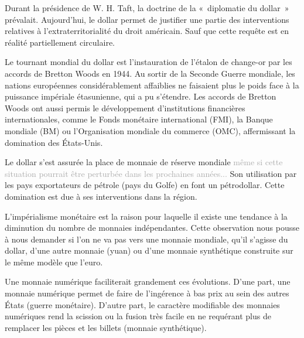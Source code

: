 Durant la présidence de W. H. Taft, la doctrine de la «~diplomatie du dollar~» prévalait. Aujourd'hui, le dollar permet de justifier une partie des interventions relatives à l'extraterritorialité du droit américain. Sauf que cette requête est en réalité partiellement circulaire.

Le tournant mondial du dollar est l'instauration de l'étalon de change-or par les accords de Bretton Woods en 1944. Au sortir de la Seconde Guerre mondiale, les nations européennes considérablement affaiblies ne faisaient plus le poids face à la puissance impériale étasunienne, qui a pu s'étendre. Les accords de Bretton Woods ont aussi permis le développement d'institutions financières internationales, comme le Fonds monétaire international (FMI), la Banque mondiale (BM) ou l'Organisation mondiale du commerce (OMC), affermissant la domination des États-Unis.

Le dollar s'est assurée la place de monnaie de réserve mondiale \textcolor{darkgray}{même si cette situation pourrait être perturbée dans les prochaines années...} Son utilisation par les pays exportateurs de pétrole (pays du Golfe) en font un pétrodollar. Cette domination est due à ses interventions dans la région.


L'impérialisme monétaire est la raison pour laquelle il existe une tendance à la diminution du nombre de monnaies indépendantes. Cette observation nous pousse à nous demander si l'on ne va pas vers une monnaie mondiale, qu'il s'agisse du dollar, d'une autre monnaie (yuan) ou d'une monnaie synthétique construite sur le même modèle que l'euro. %

Une monnaie numérique faciliterait grandement ces évolutions. D'une part, une monnaie numérique permet de faire de l'ingérence à bas prix au sein des autres États (guerre monétaire). D'autre part, le caractère modifiable des monnaies numériques rend la scission ou la fusion très facile en ne requérant plus de remplacer les pièces et les billets (monnaie synthétique).

